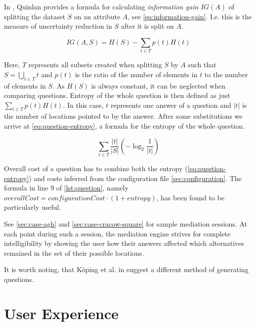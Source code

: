 In \cite{quinlan1986induction}, Quinlan provides a formula for calculating \emph{information gain} $IG(A)$ of splitting the dataset $S$ on an attribute $A$, see \cref{eq:information-gain}. I.e. this is the measure of uncertainty reduction in $S$ after it is split on $A$.

\begin{equation}
  \label{eq:information-gain}
  IG(A,S) = H(S) - \sum_{t \in T} p(t)H(t)
\end{equation}

Here, $T$ represents all subsets created when splitting $S$ by $A$ such that $S = \bigcup_{t \in T} t$ and $p(t)$ is the ratio of the number of elements in $t$ to the number of elements in $S$. As $H(S)$ is always constant, it can be neglected when comparing questions. Entropy of the whole question is then defined as just $\sum_{t \in T} p(t)H(t)$. In this case, $t$ represents one answer of a question and $\vert t \vert$ is the number of locations pointed to by the answer. After some substitutions we arrive at \cref{eq:question-entropy}, a formula for the entropy of the whole question.

\begin{equation}
  \label{eq:question-entropy}
  \sum_{t \in T} \frac{\vert t \vert}{\vert S \vert}\left(-\log_2 \frac{1}{\vert t \vert}\right)
\end{equation}

Overall cost of a question has to combine both the entropy (\cref{eq:question-entropy}) and costs inferred from the configuration file \cref{sec:configuration}. The formula in line 9 of \cref{lst:question}, namely $overallCost = configurationCost \cdot (1 + entropy)$, has been found to be particularly useful.

See \cref{sec:case-agh} and \cref{sec:case-cracow-square} for sample mediation sessions. At each point during such a session, the mediation engine strives for complete intelligibility by showing the user how their answers affected which alternatives remained in the set of their possible locations.

It is worth noting, that Köping et al. in \cite{Koeping2015indoor} suggest a different method of generating questions.






\section{User Experience}
\label{sec:user-experience}

